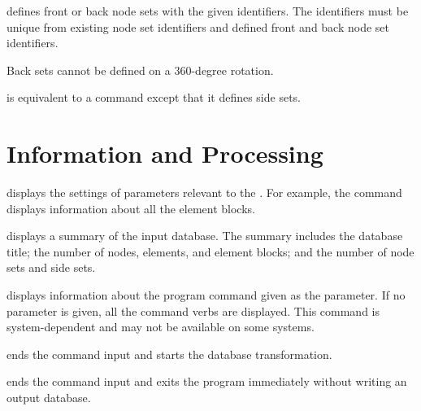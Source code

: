  {
 defines front or back node sets with the given
identifiers. The identifiers must be unique from existing node
set identifiers and defined front and back node set identifiers.

Back sets cannot be defined on a 360-degree rotation.
}

 {
 is equivalent to a  command except that it
defines side sets.
}

\newpage
\section{Information and Processing}
\label{cmd:info}

 {
 displays the settings of parameters relevant to the
. For example, the command  displays
information about all the element blocks.
}

 {
 displays a summary of the input database. The summary
includes the database title; the number of nodes, elements, and
element blocks; and the number of node sets and side sets.
}

 {
 displays information about the program command given as the
parameter. If no parameter is given, all the command verbs are
displayed. This command is system-dependent and may not be available on
some systems.
}

 {
 ends the command input and starts the database transformation.
}

 {
 ends the command input and exits the program immediately
without writing an output database.
}

